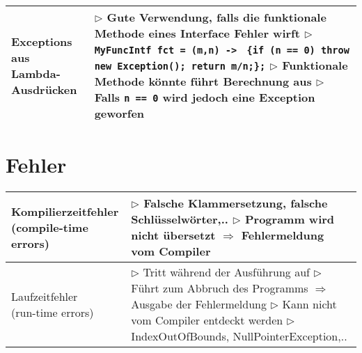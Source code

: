 \begin{tabular}{ | p{} p{} | }
    \makecell[l]{Exceptions aus \\ Lambda-Ausdrücken} & \makecell[l]{
    $\triangleright$ Gute Verwendung, falls die funktionale Methode eines Interface Fehler wirft \\
    $\triangleright$ \texttt{MyFuncIntf fct = (m,n) -> } \\
    \hspace{3cm} \texttt{\{if (n == 0) throw new Exception(); return m/n;\};} \\
    $\triangleright$ Funktionale Methode könnte führt Berechnung aus \\
    $\triangleright$ Falls \texttt{n == 0} wird jedoch eine Exception geworfen } \\ \hline

	\end{tabular}

\section{Fehler}
	\begin{tabular}{ | p{} p{} | }
	\hline

	\makecell[l]{Kompilierzeitfehler \\ (compile-time errors)} & \makecell[l]{
	$\triangleright$ Falsche Klammersetzung, falsche Schlüsselwörter,..\\
	$\triangleright$ Programm wird nicht übersetzt $\Rightarrow$ Fehlermeldung vom Compiler } \\ \hline
	
	\makecell[l]{Laufzeitfehler \\ (run-time errors)} & \makecell[l]{
	$\triangleright$ Tritt während der Ausführung auf \\
	$\triangleright$ Führt zum Abbruch des Programms $\Rightarrow$ Ausgabe der Fehlermeldung \\
	$\triangleright$ Kann nicht vom Compiler entdeckt werden \\
	$\triangleright$ IndexOutOfBounds, NullPointerException,.. } \\ \hline
	\end{tabular}

